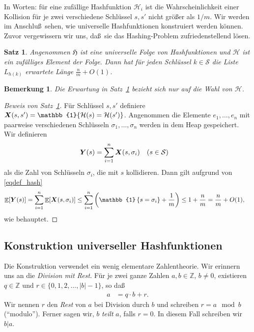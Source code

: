 \documentclass[10pt,reqno]{amsart}
\numberwithin{equation}{section}
\newcommand\cH{\mathcal H}
\newcommand\cS{\mathcal S}
\newcommand\fH{\mathfrak H}
\newcommand\vX{\vec X}
\newcommand\vY{\vec Y}
\newcommand\ZZ{\mathbb Z}
\def\vec#1{\mathchoice{\mbox{\boldmath$\displaystyle#1$}}
{\mbox{\boldmath$\textstyle#1$}}
{\mbox{\boldmath$\scriptstyle#1$}}
{\mbox{\boldmath$\scriptscriptstyle#1$}}}
\DeclareMathOperator{\ex}{\mathbb E}
\newtheorem{remark}[definition]{Bemerkung}
\newtheorem{theorem}[definition]{Satz}
\newcommand{\vecone}{\mathbb{1}}
\newcommand\bc[1]{\left({#1}\right)}
\newcommand\cbc[1]{\left\{{#1}\right\}}
\newcommand\Thm{Satz}
\begin{document}
In Worten: f\"ur eine zuf\"allige Hashfunktion $\cH_i$ ist die Wahrscheinlichkeit einer Kollision f\"ur je zwei verschiedene Schl\"ussel $s,s'$ nicht gr\"o\ss er als $1/m$.
Wir werden im Anschlu\ss\ sehen, wie universelle Hashfunktionen konstruiert werden k\"onnen.
Zuvor vergewissern wir uns, da\ss\ sie das Hashing-Problem zufriedenstellend l\"osen.

\begin{theorem}\label{thm_hash}
	Angenommen $\fH$ ist eine universelle Folge von Hashfunktionen und $\cH$ ist ein zuf\"alliges Element der Folge.
	Dann hat f\"ur jeden Schl\"ussel $k\in\cS$ die Liste $L_{h(k)}$ erwartete L\"ange $\frac nm+O(1)$.
\end{theorem}

\begin{remark}\label{rem_hash}
	Die Erwartung in \Thm~\ref{thm_hash} bezieht sich nur auf die Wahl von $\cH$.
\end{remark}

\begin{proof}[Beweis von \Thm~\ref{thm_hash}]
	F\"ur Schl\"ussel $s,s'$ definiere $\vX(s,s')=\vecone\{\cH(s)=\cH(s')\}$.
	Angenommen die Elemente $e_1,\ldots,e_n$ mit paarweise verschiedenen Schl\"usseln $\sigma_1,\ldots,\sigma_n$ werden in dem Heap gespeichert.
	Wir definieren
	\begin{align*}
		\vY(s)&=\sum_{i=1}^n\vX(s,\sigma_i)&&(s\in\cS)
	\end{align*}
	als die Zahl von Schl\"usseln $\sigma_i$, die mit $s$ kollidieren.
	Dann gilt aufgrund von \eqref{eqdef_hash}
	\begin{align*}
		\ex[\vY(s)]&=\sum_{i=1}^n\ex[\vX(s,\sigma_i)]\leq\sum_{i=1}^n\bc{\vecone\cbc{s=\sigma_i}+\frac1m}\leq1+\frac nm=\frac nm+O(1),
	\end{align*}
	wie behauptet.
\end{proof}

\subsection{Konstruktion universeller Hashfunktionen}\label{sec_uni_constr}
Die Konstruktion verwendet ein wenig elementare Zahlentheorie.
Wir erinnern uns an die {\em Division mit Rest}.
F\"ur je zwei ganze Zahlen $a,b\in\ZZ$, $b\neq0$, existieren $q\in\ZZ$ und $r\in\{0,1,2,\ldots,|b|-1\}$, so da\ss
	\begin{align*}
		a&=q\cdot b+r.
	\end{align*}
Wir nennen $r$ den {\em Rest} von $a$ bei Division durch $b$ und schreiben $r=a\mod b$ (``modulo'').
Ferner sagen wir, $b$ {\em teilt} $a$, falls $r=0$.
In diesem Fall schreiben wir $b|a$.
\end{document}

